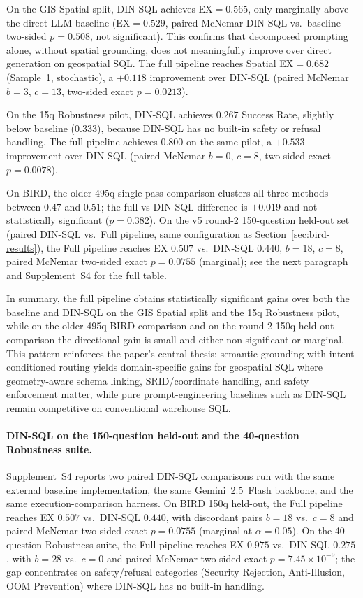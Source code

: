 \documentclass[11pt]{article}
\begin{document}
On the GIS Spatial split, DIN-SQL achieves EX$=0.565$, only marginally above the direct-LLM baseline (EX$=0.529$, paired McNemar DIN-SQL vs.\ baseline two-sided $p=0.508$, not significant). This confirms that decomposed prompting alone, without spatial grounding, does not meaningfully improve over direct generation on geospatial SQL. The full pipeline reaches Spatial EX$=0.682$ (Sample~1, stochastic), a $+0.118$ improvement over DIN-SQL (paired McNemar $b=3$, $c=13$, two-sided exact $p=0.0213$).

On the 15q Robustness pilot, DIN-SQL achieves $0.267$ Success Rate, slightly below baseline ($0.333$), because DIN-SQL has no built-in safety or refusal handling. The full pipeline achieves $0.800$ on the same pilot, a $+0.533$ improvement over DIN-SQL (paired McNemar $b=0$, $c=8$, two-sided exact $p=0.0078$).

On BIRD, the older 495q single-pass comparison clusters all three methods between $0.47$ and $0.51$; the full-vs-DIN-SQL difference is $+0.019$ and not statistically significant ($p=0.382$). On the v5 round-2 150-question held-out set (paired DIN-SQL vs.\ Full pipeline, same configuration as Section~\ref{sec:bird-results}), the Full pipeline reaches EX $0.507$ vs.\ DIN-SQL $0.440$, $b=18$, $c=8$, paired McNemar two-sided exact $p=0.0755$ (marginal); see the next paragraph and Supplement~S4 for the full table.

In summary, the full pipeline obtains statistically significant gains over both the baseline and DIN-SQL on the GIS Spatial split and the 15q Robustness pilot, while on the older 495q BIRD comparison and on the round-2 150q held-out comparison the directional gain is small and either non-significant or marginal. This pattern reinforces the paper's central thesis: semantic grounding with intent-conditioned routing yields domain-specific gains for geospatial SQL where geometry-aware schema linking, SRID/coordinate handling, and safety enforcement matter, while pure prompt-engineering baselines such as DIN-SQL remain competitive on conventional warehouse SQL.

\paragraph{DIN-SQL on the 150-question held-out and the 40-question Robustness suite.} Supplement~S4 reports two paired DIN-SQL comparisons run with the same external baseline implementation, the same Gemini~2.5~Flash backbone, and the same execution-comparison harness. On BIRD 150q held-out, the Full pipeline reaches EX $0.507$ vs.\ DIN-SQL $0.440$, with discordant pairs $b=18$ vs.\ $c=8$ and paired McNemar two-sided exact $p=0.0755$ (marginal at $\alpha=0.05$). On the 40-question Robustness suite, the Full pipeline reaches EX $0.975$ vs.\ DIN-SQL $0.275$, with $b=28$ vs.\ $c=0$ and paired McNemar two-sided exact $p=7.45\times10^{-9}$; the gap concentrates on safety/refusal categories (Security Rejection, Anti-Illusion, OOM Prevention) where DIN-SQL has no built-in handling.
\end{document}
